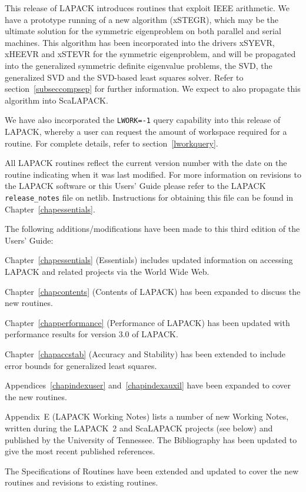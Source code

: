 This release of LAPACK introduces routines that exploit IEEE arithmetic.
We have a prototype running of a new algorithm (xSTEGR), which may be the
ultimate solution for the symmetric eigenproblem on both parallel and serial
machines.
This algorithm has been incorporated into the drivers xSYEVR, xHEEVR and xSTEVR
for the symmetric eigenproblem, and will be propagated into the generalized
symmetric definite eigenvalue problems, the SVD, the generalized SVD and the
SVD-based least squares solver.
Refer to section~\ref{subseccompsep} for further information.
We expect to also propagate this algorithm into ScaLAPACK.

We have also incorporated the {\tt LWORK=-1} query capability into this
release of LAPACK, whereby a user can request the amount of workspace required
for a routine.  For complete details, refer to section~\ref{lworkquery}.

All LAPACK routines reflect the current version number with the
date on the routine indicating when it was last modified.
For more information on revisions to the LAPACK software or this Users'
Guide please refer to the LAPACK {\tt release\_notes} file on netlib.
Instructions for obtaining this file can be found in
Chapter~\ref{chapessentials}.

The following additions/modifications have been made to this third edition
of the Users' Guide:

Chapter~\ref{chapessentials} (Essentials) 
includes updated information on accessing LAPACK and related projects 
via the World Wide Web.

Chapter~\ref{chapcontents} (Contents of LAPACK) has been expanded to discuss
the new routines.

Chapter~\ref{chapperformance} (Performance of LAPACK) has been updated
with performance results for version 3.0 of LAPACK.

Chapter~\ref{chapaccstab} (Accuracy and Stability) has been extended
to include error bounds for generalized least squares.

Appendices~\ref{chapindexuser} and~\ref{chapindexauxil} have
been expanded to cover the new routines.

Appendix~E (LAPACK Working Notes) lists a number of new
Working Notes, written during the LAPACK~2 and ScaLAPACK 
projects (see below) and published by the University of Tennessee.
The Bibliography has been updated to give
the most recent published references.

The Specifications of Routines have been extended and updated to cover
the new routines and revisions to existing routines.

